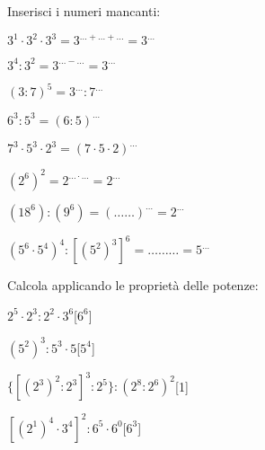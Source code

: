 \subsubsection*{}

\begin{esercizio}
\label{ese:1.10}
Inserisci i numeri mancanti:
 \begin{multicols}{2}
 \begin{enumeratea}
 \item $3^1\cdot3^2\cdot3^3=3^{\ldots+\ldots+\ldots}=3^{\ldots}$
 \item $3^4:3^2=3^{\ldots-\ldots}=3^{\ldots}$
 \item $(3:7)^5=3^{\ldots}:7^{\ldots}$
 \item $6^3:5^3=(6:5)^{\ldots}$
 \item $7^3\cdot5^3\cdot2^3=(7\cdot 5 \cdot 2)^{\ldots}$
 \item $(2^6)^2=2^{\ldots\cdot\ldots}=2^{\ldots}$
 \item $(18^6):(9^6)=(\ldots\ldots)^{\ldots}=2^{\ldots}$
 \item $(5^6\cdot5^4)^4:[(5^2)^3]^6=\ldots\ldots\ldots=5^{\ldots}$
 \end{enumeratea}

 \end{multicols}
\end{esercizio}

% 
\begin{esercizio}[\Ast]
\label{ese:1.11}
Calcola applicando le proprietà delle potenze:
 \begin{multicols}{2}
 \begin{enumeratea}
 \item $2^5\cdot2^3:2^2\cdot3^6$\hfill[$6^6$]
 \item $(5^2)^3:5^3\cdot5$\hfill[$5^4$]
 \item $\{[(2^3)^2:2^3]^3:2^5\}:(2^8:2^6)^2$\hfill[1]
 \item $[(2^1)^4\cdot 3^4]^2:6^5\cdot6^0$\hfill[$6^3$]
 \end{enumeratea}
 \end{multicols}
\end{esercizio}


